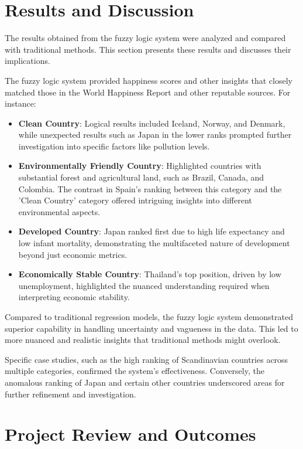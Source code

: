 \documentclass[fleqn,11pt]{article}
\begin{document}
\newpage
\section{Results and Discussion}

The results obtained from the fuzzy logic system were analyzed and compared with traditional methods. This section presents these results and discusses their implications.

The fuzzy logic system provided happiness scores and other insights that closely matched those in the World Happiness Report and other reputable sources. For instance:
\begin{itemize}
    \item \textbf{Clean Country}:  Logical results included Iceland, Norway, and Denmark, while unexpected results such as Japan in the lower ranks prompted further investigation into specific factors like pollution levels.
    \item \textbf{Environmentally Friendly Country}: Highlighted countries with substantial forest and agricultural land, such as Brazil, Canada, and Colombia. The contrast in Spain's ranking between this category and the 'Clean Country' category offered intriguing insights into different environmental aspects.
    \item \textbf{Developed Country}: Japan ranked first due to high life expectancy and low infant mortality, demonstrating the multifaceted nature of development beyond just economic metrics.
    \item \textbf{Economically Stable Country}: Thailand's top position, driven by low unemployment, highlighted the nuanced understanding required when interpreting economic stability.
\end{itemize}
Compared to traditional regression models, the fuzzy logic system demonstrated superior capability in handling uncertainty and vagueness in the data. This led to more nuanced and realistic insights that traditional methods might overlook.

Specific case studies, such as the high ranking of Scandinavian countries across multiple categories, confirmed the system's effectiveness. Conversely, the anomalous ranking of Japan and certain other countries underscored areas for further refinement and investigation.

\newpage
\section{Project Review and Outcomes}
\end{document}
